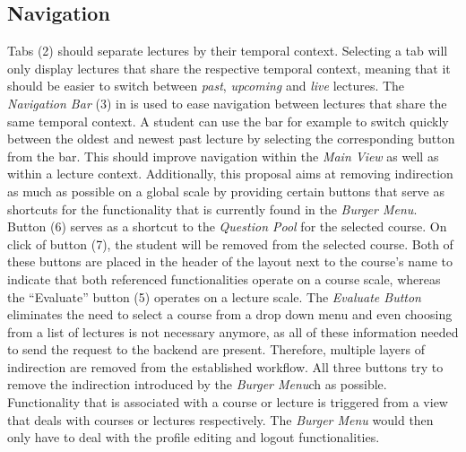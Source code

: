 \subsection{Navigation}
\label{section:con:proposals:mainview:navigation}
Tabs (2) should separate lectures by their temporal context. Selecting a tab will only display lectures that share the respective temporal context, meaning that it should be easier to switch between \emph{past}, \emph{upcoming} and \emph{live} lectures.
The \emph{Navigation Bar} (3) in  is used to ease navigation between lectures that share the same temporal context. A student can use the bar for example to switch quickly between the oldest and newest past lecture by selecting the corresponding button from the bar. This should improve navigation within the \emph{Main View} as well as within a lecture context. 
Additionally, this proposal aims at removing indirection as much as possible on a global scale by providing certain buttons that serve as shortcuts for the functionality that is currently found in the \emph{Burger Menu}. Button (6) serves as a shortcut to the \emph{Question Pool} for the selected course. On click of button (7), the student will be removed from the selected course. Both of these buttons are placed in the header of the layout next to the course’s name to indicate that both referenced functionalities operate on a course scale, whereas the “Evaluate” button (5) operates on a lecture scale. The \emph{Evaluate Button} eliminates the need to select a course from a drop down menu and even choosing from a list of lectures is not necessary anymore, as all of these information needed to send the request to the backend are present. Therefore, multiple layers of indirection are removed from the established workflow. All three buttons try to remove the indirection introduced by the \emph{Burger Menu}ch as possible. Functionality that is associated with a course or lecture is triggered from a view that deals with courses or lectures respectively. The \emph{Burger Menu} would then only have to deal with the profile editing and logout functionalities.

